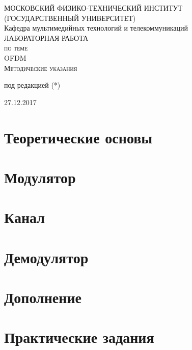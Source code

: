 \documentclass[a4paper,12pt]{article}
\begin{document}
\begin{titlepage}
  \begin{center}
    \large
    МОСКОВСКИЙ ФИЗИКО-ТЕХНИЧЕСКИЙ ИНСТИТУТ\\ (ГОСУДАРСТВЕННЫЙ УНИВЕРСИТЕТ)\\[60mm]
   
    
 
    Кафедра мультимедийных технологий и телекоммуникаций\\[5mm]
 
    \textsc{ЛАБОРАТОРНАЯ РАБОТА \\ по теме  }\\[5mm]
     
    {\LARGE OFDM}\\[6mm]
     \textsc{Методические указания }\\[100mm]
  \bigskip
     
      
\begin{center}

  под редакцией (*)

\end{center}
    
\end{center}

 


 
\begin{center}

 27.12.2017

\end{center}
\end{titlepage}

\section{Теоретические основы}
\section{Модулятор}
\section{Канал}

\section{Демодулятор}

\section{Дополнение}
\section{Практические задания}
\end{document}
